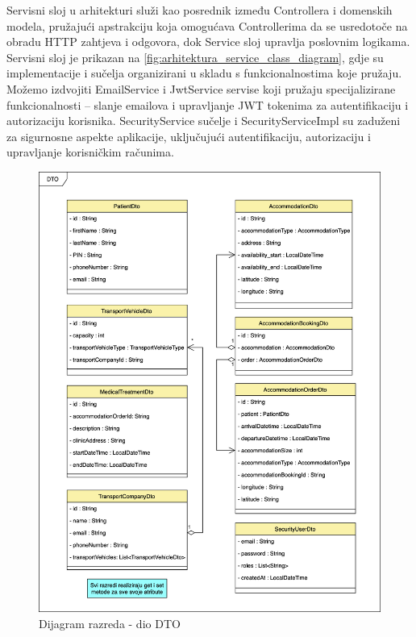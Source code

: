 			Servisni sloj u arhitekturi služi kao posrednik između Controllera i domenskih modela, pružajući apstrakciju koja omogućava Controllerima da se usredotoče na obradu HTTP zahtjeva i odgovora, dok Service sloj upravlja poslovnim logikama. Servisni sloj je prikazan na \ref{fig:arhitektura_service_class_diagram}, gdje su implementacije i sučelja organizirani u skladu s funkcionalnostima koje pružaju. Možemo izdvojiti EmailService i JwtService servise koji pružaju specijalizirane funkcionalnosti – slanje emailova i upravljanje JWT tokenima za autentifikaciju i autorizaciju korisnika. SecurityService sučelje i SecurityServiceImpl su zaduženi za sigurnosne aspekte aplikacije, uključujući autentifikaciju, autorizaciju i upravljanje korisničkim računima.
			
			\begin{figure}[H]
				\includegraphics[scale=0.12]{slike/arhitektura_dto_class_diagram_v2.png} %
				\centering
				\caption{Dijagram razreda - dio DTO}
				\label{fig:arhitektura_dto_class_diagram}
			\end{figure}
			
